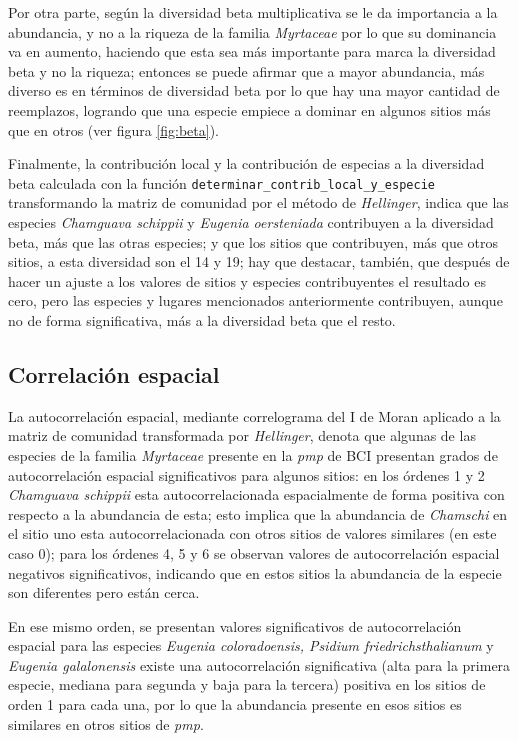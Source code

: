 \documentclass[11pt,]{article}
\begin{document}
Por otra parte, según la diversidad beta multiplicativa se le da
importancia a la abundancia, y no a la riqueza de la familia
\emph{Myrtaceae} por lo que su dominancia va en aumento, haciendo que
esta sea más importante para marca la diversidad beta y no la riqueza;
entonces se puede afirmar que a mayor abundancia, más diverso es en
términos de diversidad beta por lo que hay una mayor cantidad de
reemplazos, logrando que una especie empiece a dominar en algunos sitios
más que en otros (ver figura \ref{fig:beta}).

Finalmente, la contribución local y la contribución de especias a la
diversidad beta calculada con la función
\texttt{determinar\_contrib\_local\_y\_especie} transformando la matriz
de comunidad por el método de \emph{Hellinger}, indica que las especies
\emph{Chamguava schippii} y \emph{Eugenia oersteniada} contribuyen a la
diversidad beta, más que las otras especies; y que los sitios que
contribuyen, más que otros sitios, a esta diversidad son el 14 y 19; hay
que destacar, también, que después de hacer un ajuste a los valores de
sitios y especies contribuyentes el resultado es cero, pero las especies
y lugares mencionados anteriormente contribuyen, aunque no de forma
significativa, más a la diversidad beta que el resto.

\subsection{Correlación espacial}\label{correlaciuxf3n-espacial}

La autocorrelación espacial, mediante correlograma del I de Moran
aplicado a la matriz de comunidad transformada por \emph{Hellinger},
denota que algunas de las especies de la familia \emph{Myrtaceae}
presente en la \emph{pmp} de BCI presentan grados de autocorrelación
espacial significativos para algunos sitios: en los órdenes 1 y 2
\emph{Chamguava schippii} esta autocorrelacionada espacialmente de forma
positiva con respecto a la abundancia de esta; esto implica que la
abundancia de \emph{Chamschi} en el sitio uno esta autocorrelacionada
con otros sitios de valores similares (en este caso 0); para los órdenes
4, 5 y 6 se observan valores de autocorrelación espacial negativos
significativos, indicando que en estos sitios la abundancia de la
especie son diferentes pero están cerca.

En ese mismo orden, se presentan valores significativos de
autocorrelación espacial para las especies \emph{Eugenia coloradoensis,
Psidium friedrichsthalianum} y \emph{Eugenia galalonensis} existe una
autocorrelación significativa (alta para la primera especie, mediana
para segunda y baja para la tercera) positiva en los sitios de orden 1
para cada una, por lo que la abundancia presente en esos sitios es
similares en otros sitios de \emph{pmp}.
\end{document}
